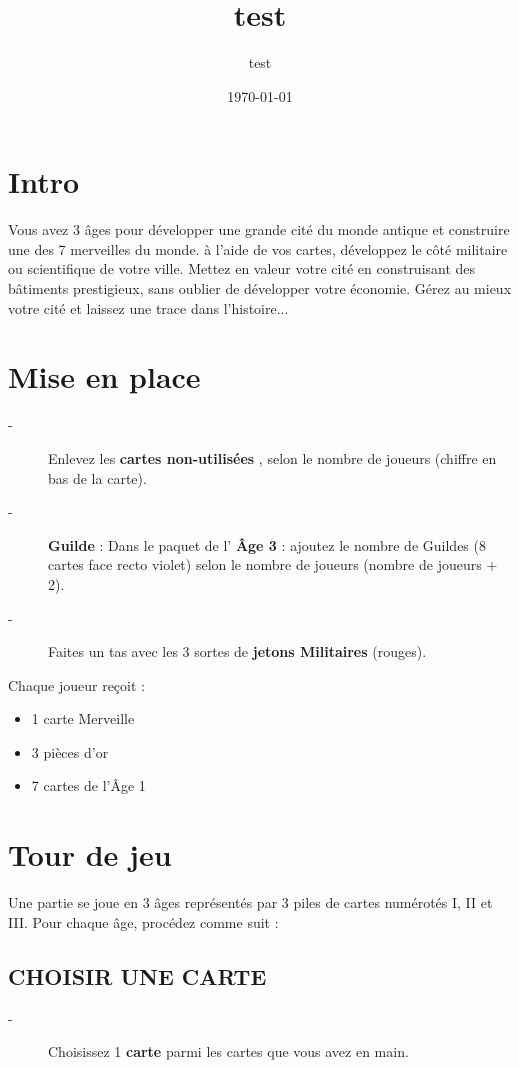 \documentclass{article}%
\title{test}%
\author{test}%
\date{\today}%
\begin{document}
%
\pagestyle{empty}%
\normalsize%
\maketitle%
\section{ Intro
}%
\label{sec:Intro}%
Vous avez 3 âges pour développer une grande cité du monde antique et construire une des 7 merveilles du
%
monde. à l’aide de vos cartes, développez le côté militaire ou scientifique de votre ville. Mettez en valeur
%
votre cité en construisant des bâtiments prestigieux, sans oublier de développer votre économie.
%
Gérez au mieux votre cité et laissez une trace dans l'histoire...


%
\section{ Mise en place
}%
\label{sec:Miseenplace}%
\begin{description}%
\item[{-} ]%
%
 Enlevez les %
\textbf{cartes non{-}utilisées}%
, selon le nombre de joueurs (chiffre en bas de la carte).
%
\item[{-} ]%
%
\textbf{Guilde}%
\textit{ }%
 : Dans le paquet de l'%
\textbf{Âge 3}%
\textit{ }%
 : ajoutez le nombre de Guildes (8 cartes face recto violet) selon le nombre de joueurs (nombre de joueurs + 2).
%
\item[{-} ]%
%
 Faites un tas avec les 3 sortes de %
\textbf{jetons Militaires}%
\textit{ }%
 (rouges).
%
\end{description}%
Chaque joueur reçoit :
%
\begin{itemize}%
\item%
%
 1 carte Merveille
%
\item%
%
 3 pièces d’or
%
\item%
%
 7 cartes de l'Âge 1
%
\end{itemize}

%
\section{ Tour de jeu
}%
\label{sec:Tourdejeu}%
Une partie se joue en 3 âges représentés par 3 piles de cartes numérotés I, II et III. Pour chaque âge, procédez comme suit :


%
\subsection{ CHOISIR UNE CARTE
}%
\label{subsec:CHOISIRUNECARTE}%
\begin{description}%
\item[{-} ]%
%
 Choisissez 1 %
\textbf{carte}%
\textit{ }%
 parmi les cartes que vous avez en main.
%
\end{description}
\end{document}
